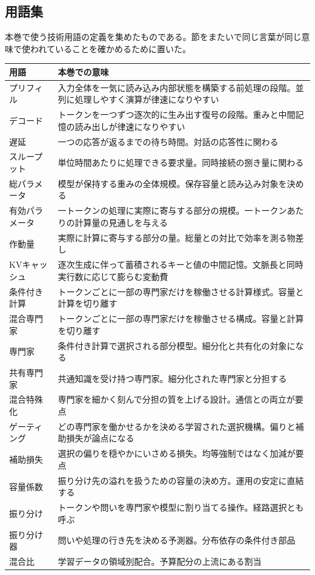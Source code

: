 \documentclass[lualatex,a4paper,10pt]{jlreq}
\begin{document}
\subsection*{用語集}
本巻で使う技術用語の定義を集めたものである。節をまたいで同じ言葉が同じ意味で使われていることを確かめるために置いた。
\begin{tabular}{@{}p{}p{}@{}}
\toprule
用語 & 本巻での意味 \\
\midrule
プリフィル & 入力全体を一気に読み込み内部状態を構築する前処理の段階。並列に処理しやすく演算が律速になりやすい \\
デコード & トークンを一つずつ逐次的に生み出す復号の段階。重みと中間記憶の読み出しが律速になりやすい \\
遅延 & 一つの応答が返るまでの待ち時間。対話の応答性に関わる \\
スループット & 単位時間あたりに処理できる要求量。同時接続の捌き量に関わる \\
総パラメータ & 模型が保持する重みの全体規模。保存容量と読み込み対象を決める \\
有効パラメータ & 一トークンの処理に実際に寄与する部分の規模。一トークンあたりの計算量の見通しを与える \\
作動量 & 実際に計算に寄与する部分の量。総量との対比で効率を測る物差し \\
KVキャッシュ & 逐次生成に伴って蓄積されるキーと値の中間記憶。文脈長と同時実行数に応じて膨らむ変動費 \\
条件付き計算 & トークンごとに一部の専門家だけを稼働させる計算様式。容量と計算を切り離す \\
混合専門家 & トークンごとに一部の専門家だけを稼働させる構成。容量と計算を切り離す \\
専門家 & 条件付き計算で選択される部分模型。細分化と共有化の対象になる \\
共有専門家 & 共通知識を受け持つ専門家。細分化された専門家と分担する \\
混合特殊化 & 専門家を細かく刻んで分担の質を上げる設計。通信との両立が要点 \\
ゲーティング & どの専門家を働かせるかを決める学習された選択機構。偏りと補助損失が論点になる \\
補助損失 & 選択の偏りを穏やかにいさめる損失。均等強制ではなく加減が要点 \\
容量係数 & 振り分け先の溢れを扱うための容量の決め方。運用の安定に直結する \\
振り分け & トークンや問いを専門家や模型に割り当てる操作。経路選択とも呼ぶ \\
振り分け器 & 問いや処理の行き先を決める予測器。分布依存の条件付き部品 \\
混合比 & 学習データの領域別配合。予算配分の上流にある割当 \\
\bottomrule
\end{tabular}
\normalsize
\end{document}
